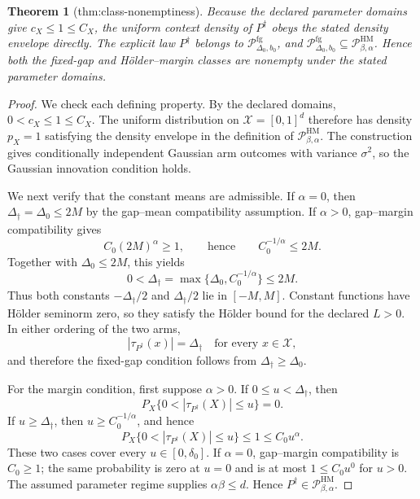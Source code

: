 \documentclass{article}
\newtheorem{theorem}{Theorem}
\begin{document}
\begin{theorem}[thm:class-nonemptiness]\label{thm:class-nonemptiness}
Because the declared parameter domains give \(c_X\le1\le C_X\), the uniform context density of \(P^\dagger\) obeys the stated density envelope directly. The explicit law \(P^\dagger\) belongs to \(\mathcal P_{\Delta_0,b_0}^{\mathrm{fg}}\), and \(\mathcal P_{\Delta_0,b_0}^{\mathrm{fg}}\subseteq\mathcal P_{\beta,\alpha}^{\mathrm{HM}}\). Hence both the fixed-gap and Hölder--margin classes are nonempty under the stated parameter domains.
\end{theorem}
\begin{proof}
We check each defining property.  By the declared domains, \(0<c_X\leq1\leq C_X\).  The uniform distribution on \(\mathcal X=[0,1]^d\) therefore has density \(p_X=1\) satisfying the density envelope in the definition of \(\mathcal P_{\beta,\alpha}^{\mathrm{HM}}\).  The construction gives conditionally independent Gaussian arm outcomes with variance \(\sigma^2\), so the Gaussian innovation condition holds.

We next verify that the constant means are admissible.  If \(\alpha=0\), then \(\Delta_\dagger=\Delta_0\leq2M\) by the gap--mean compatibility assumption.  If \(\alpha>0\), gap--margin compatibility gives
\[
C_0(2M)^\alpha\geq1,
\qquad\text{hence}\qquad
C_0^{-1/\alpha}\leq2M.
\]
Together with \(\Delta_0\leq2M\), this yields
\[
0<\Delta_\dagger=\max\{\Delta_0,C_0^{-1/\alpha}\}\leq2M.
\]
Thus both constants \(-\Delta_\dagger/2\) and \(\Delta_\dagger/2\) lie in \([-M,M]\).  Constant functions have H\"older seminorm zero, so they satisfy the H\"older bound for the declared \(L>0\).  In either ordering of the two arms,
\[
|\tau_{P^\dagger}(x)|=\Delta_\dagger
\quad\text{for every }x\in\mathcal X,
\]
and therefore the fixed-gap condition follows from \(\Delta_\dagger\geq\Delta_0\).

For the margin condition, first suppose \(\alpha>0\).  If \(0\leq u<\Delta_\dagger\), then
\[
P_X\{0<|\tau_{P^\dagger}(X)|\leq u\}=0.
\]
If \(u\geq\Delta_\dagger\), then \(u\geq C_0^{-1/\alpha}\), and hence
\[
P_X\{0<|\tau_{P^\dagger}(X)|\leq u\}
\leq1\leq C_0u^\alpha.
\]
These two cases cover every \(u\in[0,\delta_0]\).  If \(\alpha=0\), gap--margin compatibility is \(C_0\geq1\); the same probability is zero at \(u=0\) and is at most \(1\leq C_0u^0\) for \(u>0\).  The assumed parameter regime supplies \(\alpha\beta\leq d\).  Hence \(P^\dagger\in\mathcal P_{\beta,\alpha}^{\mathrm{HM}}\).


\end{proof}
\end{document}
